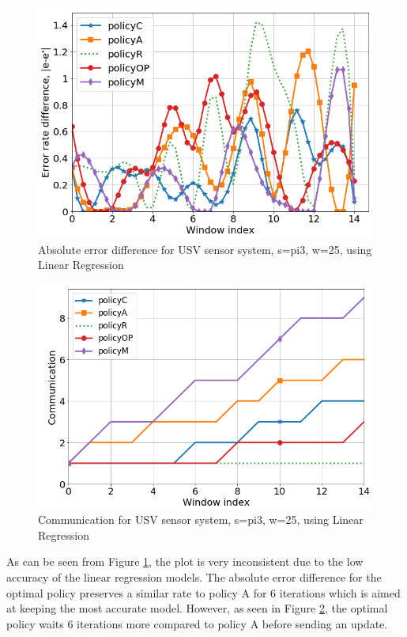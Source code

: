 \documentclass{mpaper}
\begin{document}
\begin{figure}[h]
    \centering
    \includegraphics[scale=0.33]{imgs/lin_reg_pi3_w25.png}
    \caption{Absolute error difference for USV sensor system, s=pi3, w=25, using Linear Regression}
    \label{fig:err_lin_reg_pi3}
\end{figure}

\begin{figure}[h]
    \centering
    \includegraphics[scale=0.33]{imgs/comm_lin_reg_pi3.png}
    \caption{Communication for USV sensor system, s=pi3, w=25, using Linear Regression}
    \label{fig:comm_lin_reg_pi3}
\end{figure}

As can be seen from Figure \ref{fig:err_lin_reg_pi3}, the plot is very inconsistent due to the low accuracy of the linear regression models. The absolute error difference for the optimal policy preserves a similar rate to policy A for 6 iterations which is aimed at keeping the most accurate model. However, as seen in Figure \ref{fig:comm_lin_reg_pi3}, the optimal policy waits 6 iterations more compared to policy A before sending an update.  
\end{document}

